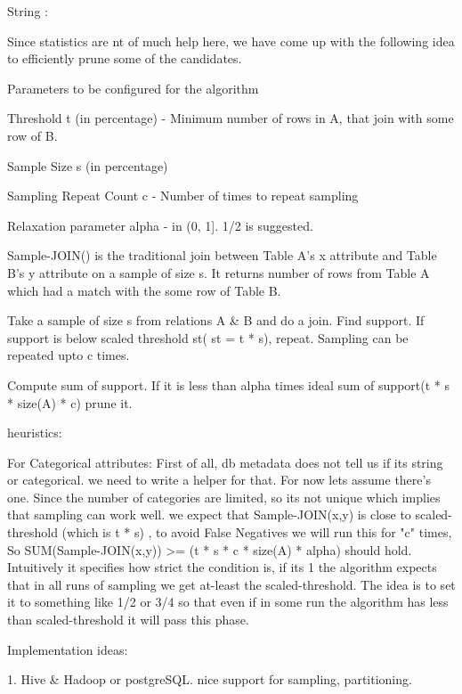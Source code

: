 \documentclass{article}
\begin{document}
String :  


Since statistics are nt of much help here, we have come up with the following idea to efficiently prune some of the candidates.

Parameters to be configured for the algorithm

Threshold t (in percentage)
 - Minimum number of rows in A, that join with some row of B.
 
Sample Size s (in percentage)

Sampling Repeat Count c
- Number of times to repeat sampling

Relaxation parameter alpha
- in (0, 1]. 1/2 is suggested.

Sample-JOIN() is the traditional join between Table A's x attribute and Table B's y attribute on a sample of size s.  It returns number of rows from Table A which had a match with the some row of Table B.

Take a sample of size s from relations A & B and do a join. Find support. If support is below scaled threshold st( st = t * s), repeat. Sampling can be repeated upto c times.

Compute sum of support. If it is less than alpha times ideal sum of support(t * s * size(A) * c) prune it.

heuristics: 

For Categorical attributes:
	         First of all, db metadata does not tell us if its string or categorical. we need to write a helper for that. For now lets assume there's one.
	         Since the number of categories are limited, so its not unique which implies that sampling can work well.
	         we expect that Sample-JOIN(x,y) is close to scaled-threshold (which is t * s) , to avoid False Negatives we will run this for "c" times, 
	         So SUM(Sample-JOIN(x,y)) >= (t * s * c * size(A) * alpha) should hold. Intuitively it specifies how strict the condition is, if its 1 the algorithm expects that in all runs of sampling we get at-least the scaled-threshold.  The idea is to set it to something like 1/2 or 3/4 so that even if in some run the algorithm has less than scaled-threshold it will pass this phase.

Implementation ideas:

1. Hive & Hadoop or postgreSQL. nice support for sampling, partitioning. 
\end{document}
